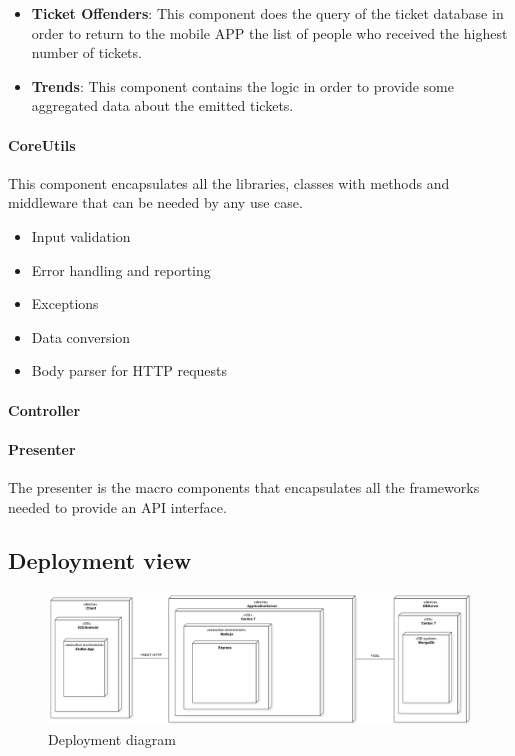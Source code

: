 \begin{itemize}
  \item \textbf{Ticket Offenders}: This component does the query of the ticket database in order to return to the mobile APP the list of people who received the highest number of tickets.

  \item \textbf{Trends}: This component contains the logic in order to provide some aggregated data about the emitted tickets.

\end{itemize}


\paragraph{CoreUtils}
This component encapsulates all the libraries, classes with methods and middleware that can be needed by any use case.
\begin{itemize}
  \item Input validation
  \item Error handling and reporting
  \item Exceptions
  \item Data conversion
  \item Body parser for HTTP requests
\end{itemize}


\paragraph{Controller}


\paragraph{Presenter}
The presenter is the macro components that encapsulates all the frameworks needed to provide an API interface.



\subsection{Deployment view}
\begin{figure}[H]
\centering
\includegraphics[width=\textwidth]{Images/DeploymentDiagram1.png}
\caption{\label{fig:deploy} Deployment diagram}
\end{figure}

